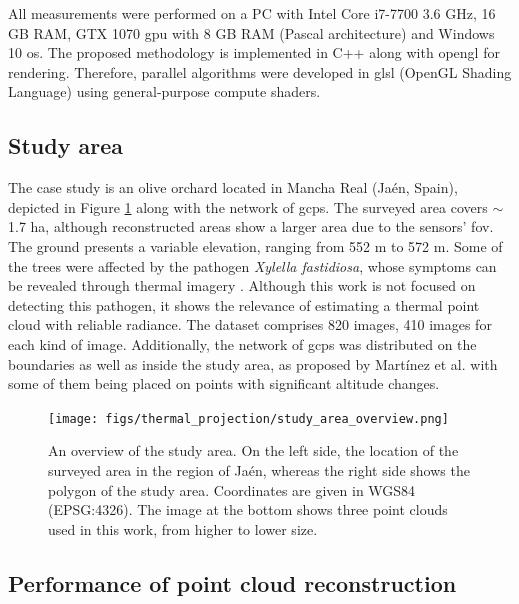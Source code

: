All measurements were performed on a PC with Intel Core i7-7700 3.6 GHz, 16 GB RAM, GTX 1070 \acrshort{gpu} with 8 GB RAM (Pascal architecture) and Windows 10 \acrshort{os}. The proposed methodology is implemented in C++ along with \acrshort{opengl} for rendering. Therefore, parallel algorithms were developed in \acrshort{glsl} (OpenGL Shading Language) using general-purpose compute shaders. 

\subsection{Study area}

The case study is an olive orchard located in Mancha Real (Jaén, Spain), depicted in Figure \ref{fig:thermal_study_area} along with the network of \acrshort{gcp}s. The surveyed area covers  $\sim$1.7 \si{\hectare}, although reconstructed areas show a larger area due to the sensors' \acrshort{fov}. The ground presents a variable elevation, ranging from 552 \si{\meter} to 572 \si{\meter}. Some of the trees were affected by the pathogen \textit{Xylella fastidiosa}, whose symptoms can be revealed through thermal imagery \cite{zarco-tejada_previsual_2018}. Although this work is not focused on detecting this pathogen, it shows the relevance of estimating a thermal point cloud with reliable radiance. The dataset comprises 820 images, 410 images for each kind of image. Additionally, the network of \acrshort{gcp}s was distributed on the boundaries as well as inside the study area, as proposed by Martínez et al. \cite{martinez-carricondo_assessment_2018} with some of them being placed on points with significant altitude changes.

\begin{figure}[ht]
    \centering
    \texttt{[image: figs/thermal\_projection/study\_area\_overview.png]}
    \caption{An overview of the study area. On the left side, the location of the surveyed area in the region of Jaén, whereas the right side shows the polygon of the study area. Coordinates are given in WGS84 (EPSG:4326). The image at the bottom shows three point clouds used in this work, from higher to lower size. }
	\label{fig:thermal_study_area}
\end{figure}

\subsection{Performance of point cloud reconstruction}

